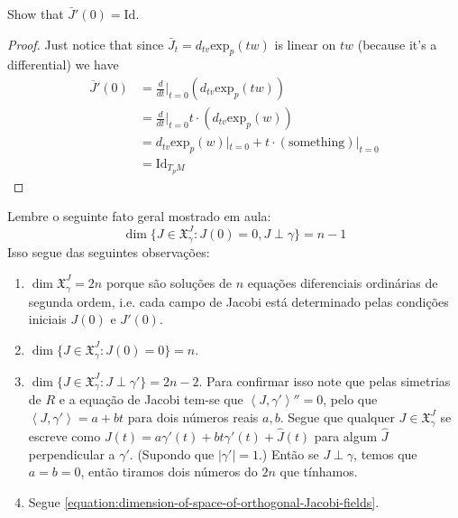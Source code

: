 \begin{exercise}
\label{exercise-Jacobi-tensor-derivative}
Show that $\bar{J}'(0)=\text{Id}$.
\end{exercise}

\begin{proof}
Just notice that since $\bar{J}_t=d_{tv}\text{exp}_p(tw)$ is linear on
$tw$ (because it's a differential) we have
\begin{align*}
\overline{J}'(0)&=\frac{d}{dt}\Big|_{t=0}(d_{tv}\text{exp}_p(tw))\\
&=\frac{d}{dt}\Big|_{t=0}t\cdot (d_{tv}\text{exp}_p(w))\\
&=d_{tv}\text{exp}_p(w)|_{t=0}+t\cdot(\text{something})|_{t=0}\\
&=\text{Id}_{T_pM}
\end{align*}
\end{proof}

\begin{remark}
\label{remark-dimension-of-space-of-Jacobi-fields}
Lembre o seguinte fato geral mostrado em aula:
\begin{equation}
\label{equation:dimension-of-space-of-orthogonal-Jacobi-fields}
\dim\{J \in \mathfrak{X}^J_\gamma:J(0)=0, J \perp \gamma\}=n-1
\end{equation}
Isso segue das seguintes observações:
\begin{enumerate}
\item $\dim\mathfrak{X}^J_\gamma=2n$ porque são soluções de $n$ equações
diferenciais ordinárias de segunda ordem, i.e. cada campo de Jacobi está
determinado pelas condições iniciais $J(0)$ e $J'(0)$. 
\item $\dim \{J \in \mathfrak{X}^J_\gamma:J(0)=0\}=n$.
\item $\dim \{J \in \mathfrak{X}^J_\gamma:J\perp \gamma'\}=2n-2$. Para
confirmar isso note que pelas simetrias de $R$ e a equação de Jacobi tem-se
que $\left<J,\gamma'\right>''=0$, pelo que $\left<J,\gamma'\right>=a+bt$
para dois números reais $a,b$. Segue que qualquer $J \in
\mathfrak{X}^J_\gamma$ se escreve como
$J(t)=a\gamma'(t)+bt\gamma'(t)+\hat{J}(t)$ para algum $\hat{J}$
perpendicular a  $\gamma'$. (Supondo que $|\gamma'|=1$.) Então se $J \perp
\gamma$, temos que  $a=b=0$, então tiramos dois números do $2n$ que
tínhamos.
\item Segue \ref{equation:dimension-of-space-of-orthogonal-Jacobi-fields}.
\end{enumerate}

\end{remark}


